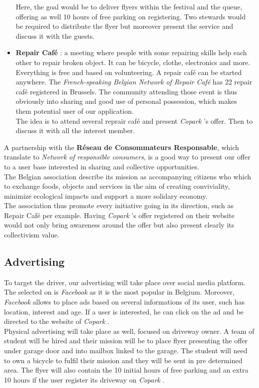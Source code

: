 \documentclass[12pt,a4paper,oneside]{book}
\newcommand{\bp}{\textit{Copark }}
\begin{document}
\begin{itemize}
Here, the goal would be to deliver flyers within the festival and the queue, offering as well 10 hours of free parking on registering. Two stewards would be required to distribute the flyer but moreover present the service and discuss it with the guests.
\item \textbf{Repair Café} : a meeting where people with some repairing skills help each other to repair broken object. It can be bicycle, clothe, electronics and more. Everything is free and based on volunteering. A repair café can be started anywhere. The \textit{French-speaking Belgian Network of Repair Café} has 22 repair café registered in Brussels.\cite{repair} The community attending those event is thus obviously into sharing and good use of personal possession, which makes them potential user of our application.\\
The idea is to attend several reprair café and present \bp's offer. Then to discuss it with all the interest member.
\end{itemize}

A partnership with the \textbf{Réseau de Consommateurs Responsable}, which translate to \textit{Network of responsible consumers}, is a good way to present our offer to a user base interested in sharing and collective opportunities.\\
The Belgian association describe its mission as accompanying citizens who which to exchange foods, objects and services in the aim of creating conviviality, minimize ecological impacts and support a more solidary economy.\cite{rcr}\\
The association thus promote every initiative going in its direction, such as Repair Café per example. Having \bp's offer registered on their website would not only bring awareness around the offer but also present clearly its collectivism value.

\subsection{Advertising}
To target the driver, our advertising will take place over social media platform. The selected on is \textit{Facebook} as it is the most popular in Belgium.\cite{smstat} Moreover, \textit{Facebook} allows to place ads based on several informations of its user, such has location, interest and age. If a user is interested, he can click on the ad and be directed to the website of \bp.\\

Physical advertising will take place as well, focused on driveway owner. A team of student will be hired and their mission will be to place flyer presenting the offer under garage door and into mailbox linked to the garage. The student will need to own a bicycle to fulfil their mission and they will be sent in pre determined area. The flyer will also contain the 10 initial hours of free parking and an extra 10 hours if the user register its driveway on \bp.
\end{document}
